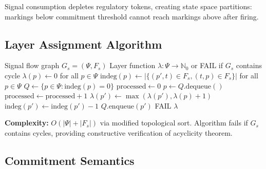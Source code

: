 \documentclass[10pt,letterpaper]{article}
\begin{document}
Signal consumption depletes regulatory tokens, creating state space partitions: markings below commitment threshold cannot reach markings above after firing.

\subsection{Layer Assignment Algorithm}

\begin{algorithm}
\caption{Hierarchical Layer Assignment}
\begin{algorithmic}[1]
\Require Signal flow graph $G_s = (\Psi, F_s)$
\Ensure Layer function $\lambda: \Psi \rightarrow \mathbb{N}_0$ or FAIL if $G_s$ contains cycle
\State $\lambda(p) \leftarrow 0$ for all $p \in \Psi$
\State $\text{indeg}(p) \leftarrow |\{(p',t) \in F_s, (t,p) \in F_s\}|$ for all $p \in \Psi$ 
\State $Q \leftarrow \{p \in \Psi : \text{indeg}(p) = 0\}$ 
\State $\text{processed} \leftarrow 0$
    \State $p \leftarrow Q.\text{dequeue}()$
    \State $\text{processed} \leftarrow \text{processed} + 1$
     
        \State $\lambda(p') \leftarrow \max(\lambda(p'), \lambda(p) + 1)$
        \State $\text{indeg}(p') \leftarrow \text{indeg}(p') - 1$
            \State $Q.\text{enqueue}(p')$
        \EndIf
    \EndFor
\EndWhile
{}
    \State \Return FAIL 
\Else
    \State \Return $\lambda$
\EndIf
\end{algorithmic}
\end{algorithm}

\textbf{Complexity:} $O(|\Psi| + |F_s|)$ via modified topological sort. Algorithm fails if $G_s$ contains cycles, providing constructive verification of acyclicity theorem.

\subsection{Commitment Semantics}
\label{sec:commitment_semantics}
\end{document}
